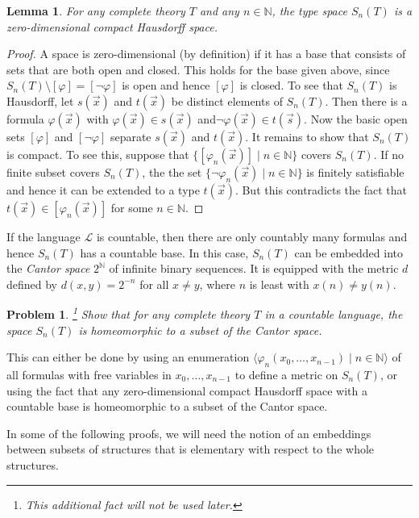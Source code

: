 \documentclass[10pt]{amsart}
\renewcommand{\L}{\mathcal{L}}
\newcommand{\NNN}{\mathbb{N}}
\newtheorem{lemma}[theorem]{Lemma}
\newtheorem{problem}[theorem]{Problem}
\theoremstyle{definition}
\theoremstyle{remark}
\begin{document}
\begin{lemma} 
For any complete theory $T$ and any $n\in\NNN$, the type space $S_n(T)$ is a zero-dimensional compact Hausdorff space. 
\end{lemma} 
\begin{proof} 
A space is zero-dimensional (by definition) if it has a base that consists of sets that are both open and closed. This holds for the base given above, since $S_n(T)\setminus [\varphi]=[\neg\varphi]$ is open and hence $[\varphi]$ is closed. To see that $S_n(T)$ is Hausdorff, let $s(\vec{x})$ and $t(\vec{x})$ be distinct elements of $S_n(T)$. Then there is a formula $\varphi(\vec{x})$ with $\varphi(\vec{x})\in s(\vec{x})$ and$\neg\varphi(\vec{x})\in t(\vec{s})$. Now the basic open sets $[\varphi]$ and $[\neg\varphi]$ separate $s(\vec{x})$ and $t(\vec{x})$. It remains to show that $S_n(T)$ is compact. To see this, suppose that $\{ [\varphi_n(\vec{x})]\mid n\in\NNN\}$ covers $S_n(T)$. If no finite subset covers $S_n(T)$, the the set $\{\neg\varphi_n(\vec{x}) \mid n\in\NNN\}$ is finitely satisfiable and hence it can be extended to a type $t(\vec{x})$. But this contradicts the fact that $t(\vec{x})\in [\varphi_n(\vec{x})]$ for some $n\in\NNN$. 
\end{proof} 

If the language $\L$ is countable, then there are only countably many formulas and hence $S_n(T)$ has a countable base. In this case, $S_n(T)$ can be embedded into the \emph{Cantor space} $2^\NNN$ of infinite binary sequences. It is equipped with the metric $d$ defined by $d(x,y)=2^{-n}$ for all $x\neq y$, where $n$ is least with $x(n)\neq y(n)$. 

\begin{problem}\footnote{This additional fact will not be used later. } 
Show that for any complete theory $T$ in a countable language, the space $S_n(T)$ is homeomorphic to a subset of the Cantor space. 
\end{problem} 

This can either be done by using an enumeration $\langle \varphi_n(x_0,\dots,x_{n-1})\mid n\in\NNN\rangle$ of all formulas with free variables in $x_0,\dots,x_{n-1}$ to define a metric on $S_n(T)$, or using the fact that any zero-dimensional compact Hausdorff space with a countable base is homeomorphic to a subset of the Cantor space. 

In some of the following proofs, we will need the notion of an embeddings between subsets of structures that is elementary with respect to the whole structures. 
\end{document}
